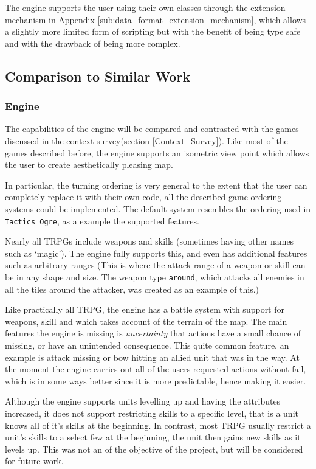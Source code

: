 The engine supports the user using their own classes through the extension mechanism in Appendix \ref{sub:data_format_extension_mechanism}, which allows a slightly more limited form of scripting but with the benefit of being type safe and with the drawback of being more complex.

% 

\subsection{Comparison to Similar Work}
\subsubsection{Engine}
\label{ssub:engine}

The capabilities of the engine will be compared and contrasted with the games discussed in the context survey(section \ref{Context_Survey}).  Like most of the games described before, the engine supports an isometric view point which allows the user to create aesthetically pleasing map.  
	
In particular, the turning ordering is very general to the extent that the user can completely replace it with their own code, all the described game ordering systems could be implemented.  The default system resembles the ordering used in \texttt{Tactics Ogre}, as a example the supported features. 

Nearly all TRPGs  include weapons and  skills (sometimes having other names such as `magic'). The engine fully supports this, and even has additional features such as arbitrary ranges (This is where the attack range of a weapon or skill can be in any shape and size. The weapon type \texttt{around}, which attacks all enemies in all the tiles around the attacker, was created as an example of this.)

Like practically all TRPG, the engine has a battle system with support for weapons, skill and which takes account of the terrain of the map.  The main features the engine is missing is \emph{uncertainty} that actions have a small chance of missing, or have an unintended consequence. This quite common feature, an example is attack missing or bow hitting an allied unit that was in the way. At the moment the engine carries out all of the users requested actions without fail, which is in some ways better since it is more predictable, hence making it easier.  

Although the engine supports units levelling up and having the attributes increased, it does not support restricting  skills to a specific level, that is a unit knows all of it's skills at the beginning. In contrast, most TRPG usually restrict a unit's skills to a select few at the beginning, the unit then gains new skills as it levels up. This was not an of the objective of the project, but will be considered for future work.

